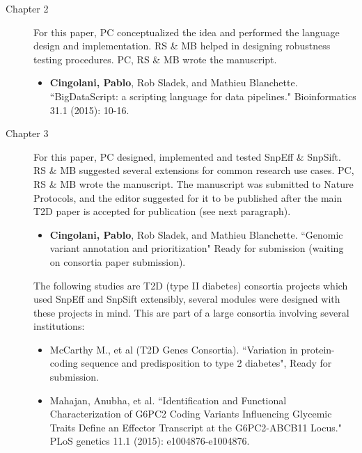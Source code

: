 \begin{description}
	
	\item[Chapter 2] For this paper, PC conceptualized the idea and performed the language design and implementation. RS \& MB helped in designing robustness testing procedures. PC, RS \& MB wrote the manuscript. 
	
	
		\begin{itemize}
		\item \textbf{Cingolani, Pablo}, Rob Sladek, and Mathieu Blanchette. ``BigDataScript: a scripting language for data pipelines." Bioinformatics 31.1 (2015): 10-16.
		\end{itemize}
	
	
	\item[Chapter 3] For this paper, PC designed, implemented and tested SnpEff \& SnpSift. RS \& MB suggested several extensions for common research use cases. PC, RS \& MB wrote the manuscript. The manuscript was submitted to Nature Protocols, and the editor suggested for it to be published after the main T2D paper is accepted for publication (see next paragraph).
	
		\begin{itemize}
		\item \textbf{Cingolani, Pablo}, Rob Sladek, and Mathieu Blanchette. ``Genomic variant annotation and prioritization" Ready for submission (waiting on consortia paper submission).
		\end{itemize}
	
	The following studies are T2D (type II diabetes) consortia projects which used SnpEff and SnpSift extensibly, several modules were designed with these projects in mind. This are part of a large consortia involving several institutions:
	
		\begin{itemize}
		
		\item McCarthy M., et al (T2D Genes Consortia). ``Variation in protein-coding sequence and predisposition to type 2 diabetes", Ready for submission.
		
		\item Mahajan, Anubha, et al. ``Identification and Functional Characterization of G6PC2 Coding Variants Influencing Glycemic Traits Define an Effector Transcript at the G6PC2-ABCB11 Locus." PLoS genetics 11.1 (2015): e1004876-e1004876.
		
		\end{itemize}
	

\end{description}
